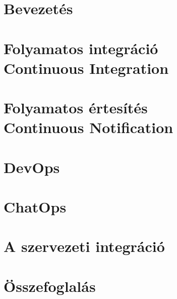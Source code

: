 \documentclass[12pt,a4paper,english,magyar,oneside]{report}
\begin{document}


\setcounter{tocdepth}{2} %
\tableofcontents %
\printnomenclature[2.5cm]


\chapter{Bevezetés}


\chapter{Folyamatos integráció\\\small Continuous Integration}
\label{chap:cont_int}


\chapter{Folyamatos értesítés\\\small Continuous Notification}
\label{chap:cont_not}


\chapter{DevOps}


\chapter{ChatOps}
\label{chapter:chatops}


\chapter{A szervezeti integráció}


\chapter{Összefoglalás}


\newpage

\printbibliography
\end{document}
